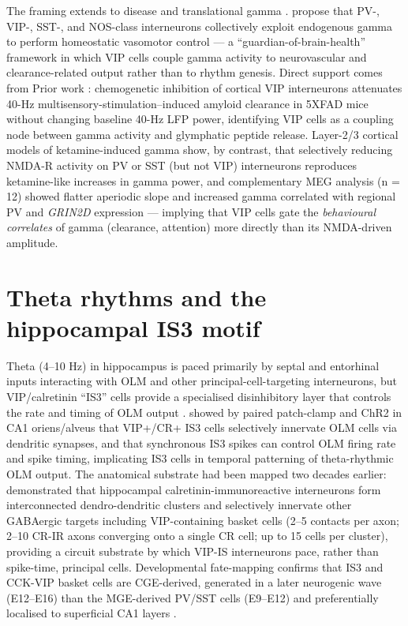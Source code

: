 \documentclass[11pt]{article}
\begin{document}
The framing extends to disease and translational gamma \citep{Goel2025, Kranz2025}. \citet{Ichim2024} propose that PV-, VIP-, SST-, and NOS-class interneurons collectively exploit endogenous gamma to perform homeostatic vasomotor control --- a ``guardian-of-brain-health'' framework in which VIP cells couple gamma activity to neurovascular and clearance-related output rather than to rhythm genesis. Direct support comes from Prior work \citep{Murdock2024}: chemogenetic inhibition of cortical VIP interneurons attenuates 40-Hz multisensory-stimulation--induced amyloid clearance in 5XFAD mice without changing baseline 40-Hz LFP power, identifying VIP cells as a coupling node between gamma activity and glymphatic peptide release. Layer-2/3 cortical models of ketamine-induced gamma show, by contrast, that selectively reducing NMDA-R activity on PV or SST (but not VIP) interneurons reproduces ketamine-like increases in gamma power, and complementary MEG analysis (n = 12) showed flatter aperiodic slope and increased gamma correlated with regional PV and \textit{GRIN2D} expression \citep{Rademacher2025} --- implying that VIP cells gate the \textit{behavioural correlates} of gamma (clearance, attention) more directly than its NMDA-driven amplitude.

\section{Theta rhythms and the hippocampal IS3 motif}

Theta (4--10 Hz) in hippocampus is paced primarily by septal and entorhinal inputs interacting with OLM and other principal-cell-targeting interneurons, but VIP/calretinin ``IS3'' cells provide a specialised disinhibitory layer that controls the rate and timing of OLM output \citep{Tyan2014, Chamberland2010, Luo2020}. \citet{Tyan2014} showed by paired patch-clamp and ChR2 in CA1 oriens/alveus that VIP+/CR+ IS3 cells selectively innervate OLM cells via dendritic synapses, and that synchronous IS3 spikes can control OLM firing rate and spike timing, implicating IS3 cells in temporal patterning of theta-rhythmic OLM output. The anatomical substrate had been mapped two decades earlier: \citet{Gulyas1996} demonstrated that hippocampal calretinin-immunoreactive interneurons form interconnected dendro-dendritic clusters and selectively innervate other GABAergic targets including VIP-containing basket cells (2--5 contacts per axon; 2--10 CR-IR axons converging onto a single CR cell; up to 15 cells per cluster), providing a circuit substrate by which VIP-IS interneurons pace, rather than spike-time, principal cells. Developmental fate-mapping confirms that IS3 and CCK-VIP basket cells are CGE-derived, generated in a later neurogenic wave (E12--E16) than the MGE-derived PV/SST cells (E9--E12) and preferentially localised to superficial CA1 layers \citep{Tricoire2011}.
\end{document}
